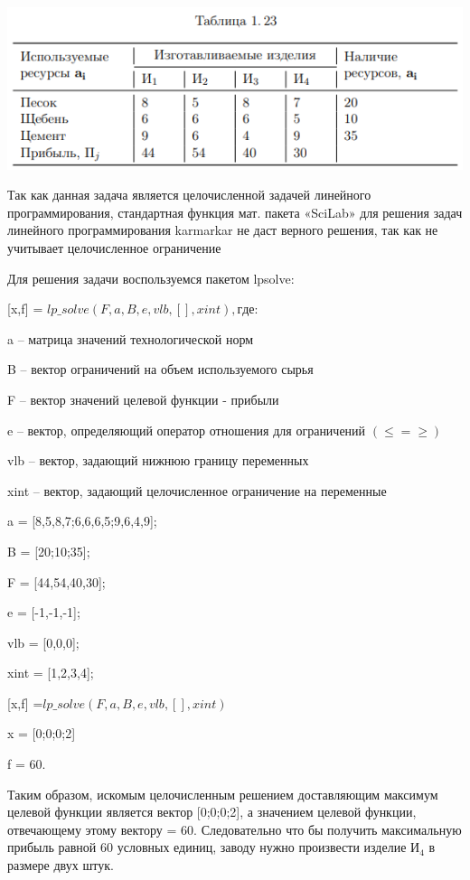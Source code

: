 \documentclass[russian,utf8,nocolumnxxxi,nocolumnxxxii]{eskdtext}
\begin{document}
{\begin{center}
\includegraphics[scale=0.7]{2019-01-09_01-47-19}
\end{center}
Так как данная задача является целочисленной задачей линейного программирования, стандартная функция мат. пакета «SciLab» для решения задач линейного программирования karmarkar не даст верного решения, так как не учитывает целочисленное ограничение
\newpage
\par
\normalsize
Для решения задачи воспользуемся пакетом lpsolve:

[x,f] =  $lp\_solve(F,a,B,e,vlb,[],xint), где:$

a – матрица значений технологической норм

B – вектор ограничений на объем используемого сырья

F – вектор значений целевой функции - прибыли

e – вектор, определяющий оператор отношения для ограничений $(\leq  =  \geq)$

vlb – вектор, задающий нижнюю границу переменных

xint – вектор, задающий целочисленное ограничение на переменные


a = [8,5,8,7;6,6,6,5;9,6,4,9];

B = [20;10;35];

F = [44,54,40,30];

e = [-1,-1,-1];

vlb = [0,0,0];

xint = [1,2,3,4];

[x,f] =$lp\_solve(F,a,B,e,vlb,[],xint)$

x = [0;0;0;2]

f = 60.

Таким образом, искомым целочисленным решением доставляющим максимум целевой функции является вектор [0;0;0;2], а значением целевой функции, отвечающему этому вектору = 60. Следовательно что бы получить максимальную прибыль равной 60 условных единиц, заводу нужно произвести изделие И$_4$ в размере двух штук.

}
\end{document}
